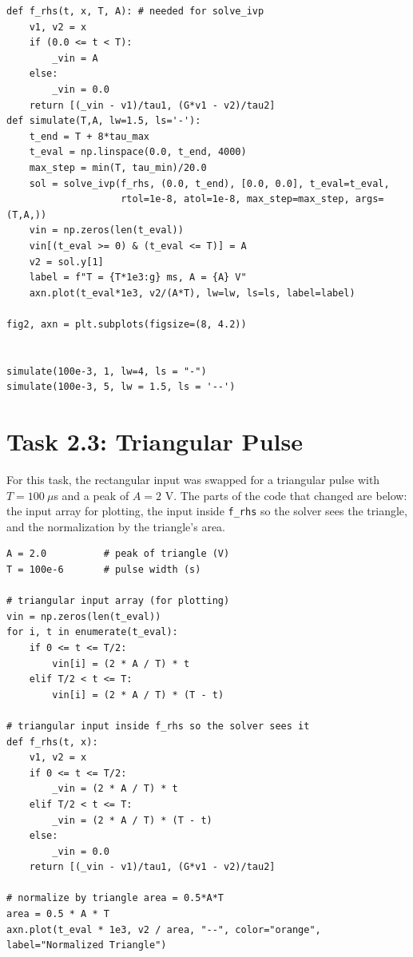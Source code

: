 \documentclass[12pt]{article}
\begin{document}
\begin{lstlisting}[style=python, caption={Modified code for comparison of area-normalized outputs for different amplitude inputs.}]
def f_rhs(t, x, T, A): # needed for solve_ivp
    v1, v2 = x
    if (0.0 <= t < T):
        _vin = A
    else:
        _vin = 0.0
    return [(_vin - v1)/tau1, (G*v1 - v2)/tau2]
def simulate(T,A, lw=1.5, ls='-'):
    t_end = T + 8*tau_max
    t_eval = np.linspace(0.0, t_end, 4000)
    max_step = min(T, tau_min)/20.0
    sol = solve_ivp(f_rhs, (0.0, t_end), [0.0, 0.0], t_eval=t_eval,
                    rtol=1e-8, atol=1e-8, max_step=max_step, args=(T,A,))
    vin = np.zeros(len(t_eval))
    vin[(t_eval >= 0) & (t_eval <= T)] = A
    v2 = sol.y[1]
    label = f"T = {T*1e3:g} ms, A = {A} V"
    axn.plot(t_eval*1e3, v2/(A*T), lw=lw, ls=ls, label=label)

fig2, axn = plt.subplots(figsize=(8, 4.2))


simulate(100e-3, 1, lw=4, ls = "-")
simulate(100e-3, 5, lw = 1.5, ls = '--')
\end{lstlisting}

\newpage
\newpage
\section*{Task 2.3: Triangular Pulse}

For this task, the rectangular input was swapped for a triangular pulse with $T = 100\ \mu$s and a peak of $A = 2$ V. The parts of the code that changed are below: the input array for plotting, the input inside \texttt{f\_rhs} so the solver sees the triangle, and the normalization by the triangle's area.

\begin{lstlisting}[style=python, caption={Modified code for triangular input}]
A = 2.0          # peak of triangle (V)
T = 100e-6       # pulse width (s)

# triangular input array (for plotting)
vin = np.zeros(len(t_eval))
for i, t in enumerate(t_eval):
    if 0 <= t <= T/2:
        vin[i] = (2 * A / T) * t
    elif T/2 < t <= T:
        vin[i] = (2 * A / T) * (T - t)

# triangular input inside f_rhs so the solver sees it
def f_rhs(t, x):
    v1, v2 = x
    if 0 <= t <= T/2:
        _vin = (2 * A / T) * t
    elif T/2 < t <= T:
        _vin = (2 * A / T) * (T - t)
    else:
        _vin = 0.0
    return [(_vin - v1)/tau1, (G*v1 - v2)/tau2]

# normalize by triangle area = 0.5*A*T
area = 0.5 * A * T
axn.plot(t_eval * 1e3, v2 / area, "--", color="orange", label="Normalized Triangle")
\end{lstlisting}
\end{document}
